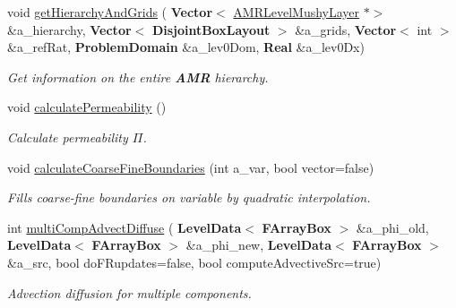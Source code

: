 \begin{DoxyCompactItemize}
\mbox{\label{class_a_m_r_level_mushy_layer_ae7e0fe54da114a5783449790de226ae6}} 
void \hyperlink{class_a_m_r_level_mushy_layer_ae7e0fe54da114a5783449790de226ae6}{get\+Hierarchy\+And\+Grids} (\textbf{ Vector}$<$ \hyperlink{class_a_m_r_level_mushy_layer}{A\+M\+R\+Level\+Mushy\+Layer} $\ast$$>$ \&a\+\_\+hierarchy, \textbf{ Vector}$<$ \textbf{ Disjoint\+Box\+Layout} $>$ \&a\+\_\+grids, \textbf{ Vector}$<$ int $>$ \&a\+\_\+ref\+Rat, \textbf{ Problem\+Domain} \&a\+\_\+lev0\+Dom, \textbf{ Real} \&a\+\_\+lev0\+Dx)
\begin{DoxyCompactList}\small\item\em Get information on the entire \textbf{ A\+MR} hierarchy. \end{DoxyCompactList}\item 
\mbox{\label{class_a_m_r_level_mushy_layer_aef9f77f57da892bd8930943bfbec9a6b}} 
void \hyperlink{class_a_m_r_level_mushy_layer_aef9f77f57da892bd8930943bfbec9a6b}{calculate\+Permeability} ()
\begin{DoxyCompactList}\small\item\em Calculate permeability $ \Pi $. \end{DoxyCompactList}\item 
\mbox{\label{class_a_m_r_level_mushy_layer_a3b0111c15c91c012d328e42b43fa954f}} 
void \hyperlink{class_a_m_r_level_mushy_layer_a3b0111c15c91c012d328e42b43fa954f}{calculate\+Coarse\+Fine\+Boundaries} (int a\+\_\+var, bool vector=false)
\begin{DoxyCompactList}\small\item\em Fills coarse-\/fine boundaries on variable by quadratic interpolation. \end{DoxyCompactList}\item 
\mbox{\label{class_a_m_r_level_mushy_layer_adc086e9a094b35435de36aadb3891ab7}} 
int \hyperlink{class_a_m_r_level_mushy_layer_adc086e9a094b35435de36aadb3891ab7}{multi\+Comp\+Advect\+Diffuse} (\textbf{ Level\+Data}$<$ \textbf{ F\+Array\+Box} $>$ \&a\+\_\+phi\+\_\+old, \textbf{ Level\+Data}$<$ \textbf{ F\+Array\+Box} $>$ \&a\+\_\+phi\+\_\+new, \textbf{ Level\+Data}$<$ \textbf{ F\+Array\+Box} $>$ \&a\+\_\+src, bool do\+F\+Rupdates=false, bool compute\+Advective\+Src=true)
\begin{DoxyCompactList}\small\item\em Advection diffusion for multiple components. \end{DoxyCompactList}\item 
$$
\end{DoxyCompactItemize}
